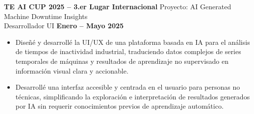 \documentclass[11pt]{article}
\begin{document}
\textbf{TE AI CUP 2025 -- 3.er Lugar Internacional} \hfill Proyecto: AI Generated Machine Downtime Insights\\
Desarrollador UI \hfill \textbf{Enero -- Mayo 2025}
\vspace{-0.3cm}
\begin{itemize}[leftmargin=*]
    \item Diseñé y desarrollé la UI/UX de una plataforma basada en IA para el análisis de tiempos de inactividad industrial, traduciendo datos complejos de series temporales de máquinas y resultados de aprendizaje no supervisado en información visual clara y accionable.
    
    \vspace{-0.3cm}
    \item Desarrollé una interfaz accesible y centrada en el usuario para personas no técnicas, simplificando la exploración e interpretación de resultados generados por IA sin requerir conocimientos previos de aprendizaje automático.
    
\end{itemize}
\end{document}
